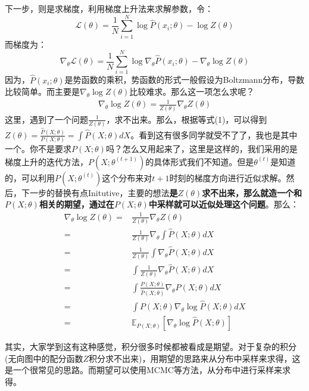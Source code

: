 \documentclass[a4paper]{article}
\begin{document}
下一步，则是求梯度，利用梯度上升法来求解参数，令：
$$
\mathcal{L}(\theta) = \frac{1}{N} \sum_{i=1}^N \log \hat{P}(x_i;\theta) - \log Z(\theta)
$$
而梯度为：
\begin{equation}
    \nabla_\theta \mathcal{L}(\theta) = \frac{1}{N} \sum_{i=1}^N \log \nabla_\theta \hat{P}(x_i;\theta) -\nabla_\theta \log Z(\theta)
\end{equation}
因为，$\hat{P}(x_i;\theta)$是势函数的乘积，势函数的形式一般假设为Boltzmann分布，导数比较简单。而主要是$\nabla_\theta \log Z(\theta)$比较难求。那么这一项怎么求呢？
\begin{equation}
    \begin{split}
       \nabla_\theta \log Z(\theta) = \frac{1}{Z(\theta)} \nabla_\theta Z(\theta) 
    \end{split}
\end{equation}
这里，遇到了一个问题$\frac{1}{Z(\theta)}$，求不出来。那么，根据等式(1)，可以得到$Z(\theta) = \frac{\hat{P}(X;\theta)}{P(X;\theta)} = \int \hat{P}(X;\theta) dX$。看到这有很多同学就受不了了，我也是其中一个。你不是要求$P(X;\theta)$吗？怎么又用起来了，这里是这样的，我们采用的是梯度上升的迭代方法，$P(X;\theta^{(t+1)})$的具体形式我们不知道。但是$\theta^{(t)}$是知道的，可以利用$P(X;\theta^{(t)})$这个分布来对$t+1$时刻的梯度方向进行近似求解。然后，下一步的替换有点Initutive，主要的想法\textbf{是$Z(\theta)$求不出来，那么就造一个和$P(X;\theta)$相关的期望，通过在$P(X;\theta)$中采样就可以近似处理这个问题}。那么：
\begin{equation}
    \begin{split}
       \nabla_\theta \log Z(\theta) = & \frac{1}{Z(\theta)} \nabla_\theta Z(\theta) \\
       = & \frac{1}{Z(\theta)} \nabla_\theta \int \hat{P}(X;\theta) dX \\
       = & \frac{1}{Z(\theta)} \int \nabla_\theta  \hat{P}(X;\theta) dX \\
       = & \int  \frac{1}{Z(\theta)}  \nabla_\theta \hat{P}(X;\theta) dX \\
       = & \int  \frac{P(X;\theta)}{\hat{P}(X;\theta)}  \nabla_\theta \hat{P}(X;\theta) dX \\
       = & \int P(X;\theta)  \nabla_\theta \log \hat{P}(X;\theta) dX \\
       = & \mathbb{E}_{P(X;\theta)} [\nabla_\theta \log \hat{P}(X;\theta)]
    \end{split}
\end{equation}

其实，大家学到这有这种感觉，积分很多时候都被看成是期望。对于复杂的积分(无向图中的配分函数$Z$积分求不出来)，用期望的思路来从分布中采样来求得，这是一个很常见的思路。而期望可以使用MCMC等方法，从分布中进行采样来求得。
\end{document}
